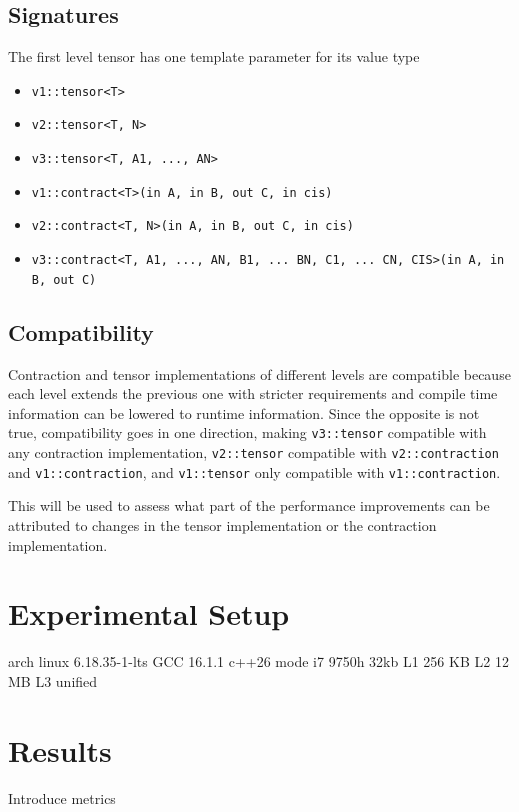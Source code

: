 \documentclass[conference]{IEEEtran}
\begin{document}
\subsection{Signatures}
The first level tensor has one template parameter for its value type
\begin{itemize}
    \item \texttt{v1::tensor<T>}
    \item \texttt{v2::tensor<T, N>}
    \item \texttt{v3::tensor<T, A1, ..., AN>}
\end{itemize}
\begin{itemize}
    \item \texttt{v1::contract<T>(in A, in B, out C, in cis)}
    \item \texttt{v2::contract<T, N>(in A, in B, out C, in cis)}
    \item \texttt{v3::contract<T, A1, ..., AN, B1, ... BN, C1, ... CN, CIS>(in A, in B, out C)}
\end{itemize}

\subsection{Compatibility}

Contraction and tensor implementations of different levels are compatible
because each level extends the previous one with stricter requirements and
compile time information can be lowered to runtime information.
Since the opposite is not true, compatibility goes in one direction, making
\texttt{v3::tensor} compatible with any contraction implementation, 
\texttt{v2::tensor} compatible with \texttt{v2::contraction} and
\texttt{v1::contraction}, and \texttt{v1::tensor} only compatible with
\texttt{v1::contraction}.

This will be used to assess what part of the performance improvements can be
attributed to changes in the tensor implementation or the contraction
implementation.


\section{Experimental Setup}

arch linux 6.18.35-1-lts
GCC 16.1.1 c++26 mode
i7 9750h
32kb L1
256 KB L2
12 MB L3 unified

\section{Results}
Introduce metrics
\end{document}

